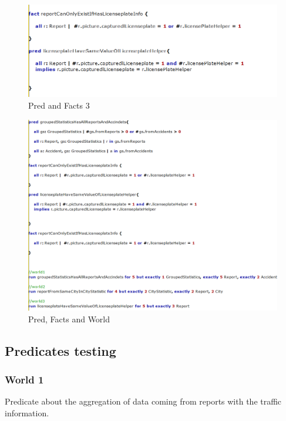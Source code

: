 \begin{figure}[h]
	\centering
	\includegraphics[width=0.9\linewidth, height=0.3\textheight]{Images/Alloy/codealloy6}
	\caption{Pred and Facts 3}
	\label{Pred and Facts 3}
\end{figure}

\begin{figure}[h]
	\centering
	\includegraphics[width=0.95\linewidth, height=0.86\textheight]{Images/Alloy/codealloy7}
	\caption{Pred, Facts and World}
	\label{Pred and Facts and World}
\end{figure}
\FloatBarrier
\subsection{Predicates testing}
\subsubsection{World 1}
Predicate about the aggregation of data coming from reports with the traffic information.

